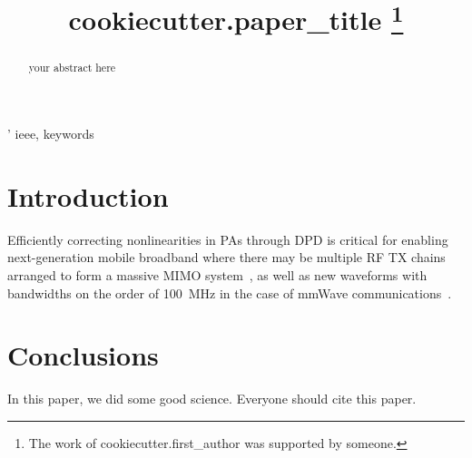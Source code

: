 \documentclass[conference]{style/IEEEtran}
\begin{document}

\title{ {{cookiecutter.paper_title}}
\thanks{The work of {{cookiecutter.first_author}} was supported by someone.}
}

\author{%
}
	

\maketitle

\begin{abstract}
your abstract here
\end{abstract}

\begin{IEEEkeywords}'
ieee, keywords
\end{IEEEkeywords}

 

\section{Introduction}
Efficiently correcting nonlinearities  in \acp{PA} through \ac{DPD} is critical for enabling next-generation mobile broadband where there may be multiple \ac{RF} \ac{TX} chains arranged to form a massive \ac{MIMO} system~\cite{2014_MassiveMimo}, as well as new waveforms with bandwidths on the order of 100~MHz in the case of mmWave communications~\cite{2014_mmwave}. 


\section{Conclusions}
In this paper, we did some good science. Everyone should cite this paper.


\end{document}
